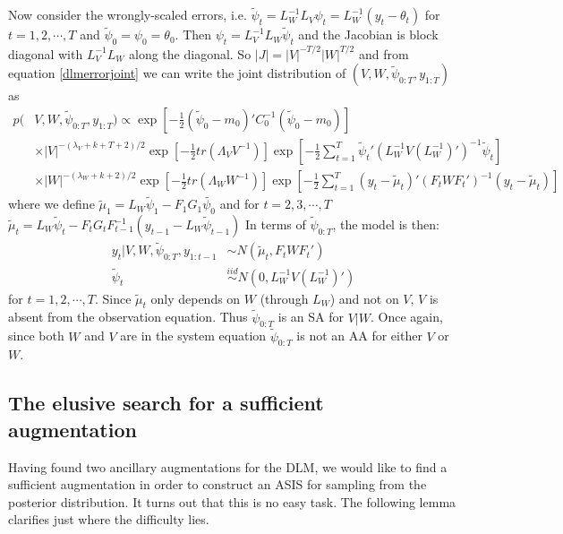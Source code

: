 \documentclass{article}
\begin{document}
Now consider the wrongly-scaled errors, i.e. $\tilde{\psi}_t=L_W^{-1}L_V\psi_t=L_W^{-1}(y_t - \theta_t)$ for $t=1,2,\cdots,T$ and $\tilde{\psi}_0=\psi_0=\theta_0$. Then $\psi_t = L_V^{-1}L_W\tilde{\psi}_t$ and the Jacobian is block diagonal with $L_V^{-1}L_W$ along the diagonal. So $|J|=|V|^{-T/2}|W|^{T/2}$ and from equation \eqref{dlmerrorjoint} we can write the joint distribution of $(V, W, \tilde{\psi}_{0:T}, y_{1:T})$ as
\begin{align}
    p(&V,W,\tilde{\psi}_{0:T},y_{1:T}) \propto \exp\left[-\frac{1}{2}(\tilde{\psi}_0-m_0)'C_0^{-1}(\tilde{\psi}_0-m_0)\right] \nonumber\\
   &\times |V|^{-(\lambda_V + k + T + 2)/2}\exp\left[-\frac{1}{2}tr\left(\Lambda_VV^{-1}\right)\right] \exp\left[-\frac{1}{2}\sum_{t=1}^T\tilde{\psi}_t'(L_W^{-1}V(L_W^{-1})')^{-1}\tilde{\psi}_t\right] \nonumber\\
    & \times |W|^{-(\lambda_W + k + 2)/2}\exp\left[-\frac{1}{2}tr\left(\Lambda_WW^{-1}\right)\right]\exp\left[-\frac{1}{2}\sum_{t=1}^T(y_t - \tilde{\mu}_t)'(F_tWF_t')^{-1}(y_t-\tilde{\mu}_t)\right]\label{dlmerrortildejoint}
 \end{align}
where we define $\tilde{\mu}_1 = L_W\tilde{\psi}_1 - F_1G_1\tilde{\psi_0}$ and for $t=2,3,\cdots,T$ $\tilde{\mu}_t =L_W\tilde{\psi}_t - F_tG_tF_{t-1}^{-1}(y_{t-1} - L_{W}\tilde{\psi}_{t-1})$ In terms of $\tilde{\psi}_{0:T}$, the model is then:
 \begin{align*}
   y_t|V,W,\tilde{\psi}_{0:T},y_{1:t-1} &\sim N(\tilde{\mu}_t, F_tWF_t')\\
   \tilde{\psi}_t & \stackrel{iid}{\sim} N(0,L_W^{-1}V(L_W^{-1})')
\end{align*}
for $t=1,2,\cdots,T$. Since $\tilde{\mu}_t$ only depends on $W$ (through $L_W$) and not on $V$, $V$ is absent from the observation equation. Thus $\tilde{\psi}_{0:T}$ is an SA for $V|W$. Once again, since both $W$ and $V$ are in the system equation $\tilde{\psi}_{0:T}$ is not an AA for either $V$ or $W$.

\subsection{The elusive search for a sufficient augmentation}

Having found two ancillary augmentations for the DLM, we would like to find a sufficient augmentation in order to construct an ASIS for sampling from the posterior distribution. It turns out that this is no easy task. The following lemma clarifies just where the difficulty lies.
\end{document}
